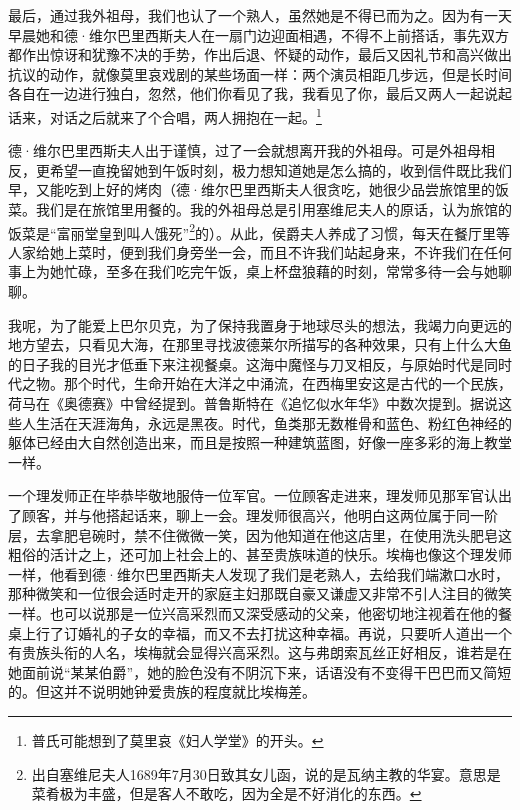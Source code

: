 \par 最后，通过我外祖母，我们也认了一个熟人，虽然她是不得已而为之。因为有一天早晨她和德·维尔巴里西斯夫人在一扇门边迎面相遇，不得不上前搭话，事先双方都作出惊讶和犹豫不决的手势，作出后退、怀疑的动作，最后又因礼节和高兴做出抗议的动作，就像莫里哀戏剧的某些场面一样：两个演员相距几步远，但是长时间各自在一边进行独白，忽然，他们你看见了我，我看见了你，最后又两人一起说起话来，对话之后就来了个合唱，两人拥抱在一起。\footnote{普氏可能想到了莫里哀《妇人学堂》的开头。}
\par 德·维尔巴里西斯夫人出于谨慎，过了一会就想离开我的外祖母。可是外祖母相反，更希望一直挽留她到午饭时刻，极力想知道她是怎么搞的，收到信件既比我们早，又能吃到上好的烤肉（德·维尔巴里西斯夫人很贪吃，她很少品尝旅馆里的饭菜。我们是在旅馆里用餐的。我的外祖母总是引用塞维尼夫人的原话，认为旅馆的饭菜是“富丽堂皇到叫人饿死”\footnote{出自塞维尼夫人1689年7月30日致其女儿函，说的是瓦纳主教的华宴。意思是菜肴极为丰盛，但是客人不敢吃，因为全是不好消化的东西。}的）。从此，侯爵夫人养成了习惯，每天在餐厅里等人家给她上菜时，便到我们身旁坐一会，而且不许我们站起身来，不许我们在任何事上为她忙碌，至多在我们吃完午饭，桌上杯盘狼藉的时刻，常常多待一会与她聊聊。
\par 我呢，为了能爱上巴尔贝克，为了保持我置身于地球尽头的想法，我竭力向更远的地方望去，只看见大海，在那里寻找波德莱尔所描写的各种效果，只有上什么大鱼的日子我的目光才低垂下来注视餐桌。这海中魔怪与刀叉相反，与原始时代是同时代之物。那个时代，生命开始在大洋之中涌流，在西梅里安这是古代的一个民族，荷马在《奥德赛》中曾经提到。普鲁斯特在《追忆似水年华》中数次提到。据说这些人生活在天涯海角，永远是黑夜。时代，鱼类那无数椎骨和蓝色、粉红色神经的躯体已经由大自然创造出来，而且是按照一种建筑蓝图，好像一座多彩的海上教堂一样。
\par 一个理发师正在毕恭毕敬地服侍一位军官。一位顾客走进来，理发师见那军官认出了顾客，并与他搭起话来，聊上一会。理发师很高兴，他明白这两位属于同一阶层，去拿肥皂碗时，禁不住微微一笑，因为他知道在他这店里，在使用洗头肥皂这粗俗的活计之上，还可加上社会上的、甚至贵族味道的快乐。埃梅也像这个理发师一样，他看到德·维尔巴里西斯夫人发现了我们是老熟人，去给我们端漱口水时，那种微笑和一位很会适时走开的家庭主妇那既自豪又谦虚又非常不引人注目的微笑一样。也可以说那是一位兴高采烈而又深受感动的父亲，他密切地注视着在他的餐桌上行了订婚礼的子女的幸福，而又不去打扰这种幸福。再说，只要听人道出一个有贵族头衔的人名，埃梅就会显得兴高采烈。这与弗朗索瓦丝正好相反，谁若是在她面前说“某某伯爵”，她的脸色没有不阴沉下来，话语没有不变得干巴巴而又简短的。但这并不说明她钟爱贵族的程度就比埃梅差。

